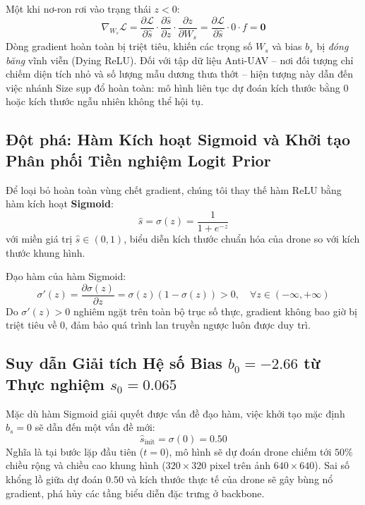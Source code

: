 \documentclass[11pt,a4paper]{article}
\begin{document}
Một khi nơ-ron rơi vào trạng thái $z < 0$:
\begin{equation}
    \nabla_{W_s} \mathcal{L} = \frac{\partial \mathcal{L}}{\partial \hat{s}} \cdot \frac{\partial \hat{s}}{\partial z} \cdot \frac{\partial z}{\partial W_s} = \frac{\partial \mathcal{L}}{\partial \hat{s}} \cdot 0 \cdot f = \mathbf{0}
\end{equation}
Dòng gradient hoàn toàn bị triệt tiêu, khiến các trọng số $W_s$ và bias $b_s$ bị \textit{đóng băng} vĩnh viễn (Dying ReLU). Đối với tập dữ liệu Anti-UAV -- nơi đối tượng chỉ chiếm diện tích nhỏ và số lượng mẫu dương thưa thớt -- hiện tượng này dẫn đến việc nhánh Size sụp đổ hoàn toàn: mô hình liên tục dự đoán kích thước bằng 0 hoặc kích thước ngẫu nhiên không thể hội tụ.

\subsection{Đột phá: Hàm Kích hoạt Sigmoid và Khởi tạo Phân phối Tiền nghiệm Logit Prior}
Để loại bỏ hoàn toàn vùng chết gradient, chúng tôi thay thế hàm ReLU bằng hàm kích hoạt \textbf{Sigmoid}:
\begin{equation}
    \hat{s} = \sigma(z) = \frac{1}{1 + e^{-z}}
\end{equation}
với miền giá trị $\hat{s} \in (0, 1)$, biểu diễn kích thước chuẩn hóa của drone so với kích thước khung hình.

Đạo hàm của hàm Sigmoid:
\begin{equation}
    \sigma'(z) = \frac{\partial \sigma(z)}{\partial z} = \sigma(z)\left(1 - \sigma(z)\right) > 0, \quad \forall z \in (-\infty, +\infty)
\end{equation}
Do $\sigma'(z) > 0$ nghiêm ngặt trên toàn bộ trục số thực, gradient không bao giờ bị triệt tiêu về 0, đảm bảo quá trình lan truyền ngược luôn được duy trì.


\subsection{Suy dẫn Giải tích Hệ số Bias \texorpdfstring{$b_0 = -2.66$}{b0 = -2.66} từ Thực nghiệm \texorpdfstring{$s_0 = 0.065$}{s0 = 0.065}}
Mặc dù hàm Sigmoid giải quyết được vấn đề đạo hàm, việc khởi tạo mặc định $b_s = 0$ sẽ dẫn đến một vấn đề mới:
\begin{equation}
    \hat{s}_{\text{init}} = \sigma(0) = 0.50
\end{equation}
Nghĩa là tại bước lặp đầu tiên ($t = 0$), mô hình sẽ dự đoán drone chiếm tới $50\%$ chiều rộng và chiều cao khung hình ($320 \times 320$ pixel trên ảnh $640 \times 640$). Sai số khổng lồ giữa dự đoán $0.50$ và kích thước thực tế của drone sẽ gây bùng nổ gradient, phá hủy các tầng biểu diễn đặc trưng ở backbone.
\end{document}
